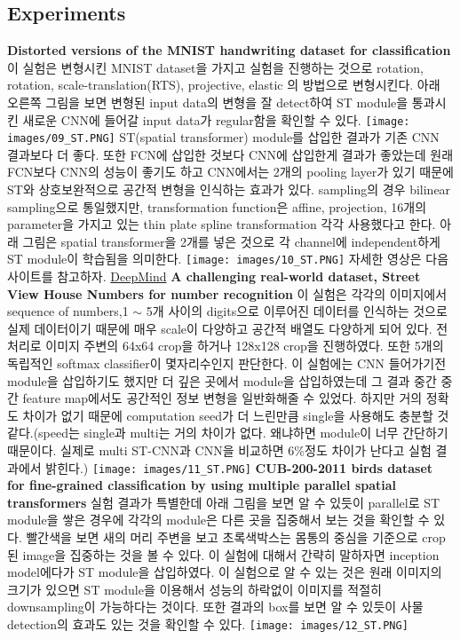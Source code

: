 \documentclass[extendedabs]{bmvc2k}
\begin{document}
 \subsection{Experiments}
 \textbf{Distorted versions of the MNIST handwriting dataset for classification} 이 실험은 변형시킨 MNIST dataset을 가지고 실험을 진행하는 것으로 rotation, rotation, scale-translation(RTS), projective, elastic
 의 방법으로 변형시킨다. 아래 오른쪽 그림을 보면 변형된 input data의 변형을 잘 detect하여 ST module을 통과시킨 새로운 CNN에 들어갈 input data가 regular함을 확인할 수 있다.
 \newline  \texttt{[image: images/09\_ST.PNG]}
  ST(spatial transformer) module를 삽입한 결과가 기존 CNN 결과보다 더 좋다. 또한 FCN에 삽입한 것보다 CNN에 삽입한게 결과가 좋았는데 원래 FCN보다 CNN의 성능이 좋기도 하고 
  CNN에서는 2개의 pooling layer가 있기 때문에 ST와 상호보완적으로 공간적 변형을 인식하는 효과가 있다. sampling의 경우 bilinear sampling으로 통일했지만, transformation function은 
  affine, projection, 16개의 parameter을 가지고 있는 thin plate spline transformation 각각 사용했다고 한다.
 아래 그림은 spatial transformer을 2개를 넣은 것으로 각 channel에 independent하게 ST module이 학습됨을 의미한다. 
 \newline  \texttt{[image: images/10\_ST.PNG]}
 자세한 영상은 다음 사이트를 참고하자.
 \href{https://www.youtube.com/watch?v=yGFVO2B8gok&t=8s}{DeepMind}
 \newline \textbf{A challenging real-world dataset, Street View House Numbers for number recognition}
 이 실험은 각각의 이미지에서 sequence of numbers,1 $\sim$ 5개 사이의 digits으로 이루어진 데이터를 인식하는 것으로 실제 데이터이기 때문에 매우 scale이 다양하고 
 공간적 배열도 다양하게 되어 있다. 전처리로 이미지 주변의 64x64 crop을 하거나 128x128 crop을 진행하였다. 또한 5개의 독립적인 softmax classifier이 몇자리수인지 판단한다.
 이 실험에는 CNN 들어가기전 module을 삽입하기도 했지만 더 깊은 곳에서 module을 삽입하였는데 그 결과 중간 중간 feature map에서도 공간적인 정보 변형을 일반화해줄 수 있었다.
 하지만 거의 정확도 차이가 없기 때문에 computation seed가 더 느린만큼 single을 사용해도 충분할 것 같다.(speed는 single과 multi는 거의 차이가 없다. 왜냐하면 module이 너무 간단하기 때문이다.
 실제로 multi ST-CNN과 CNN을 비교하면 6\%정도 차이가 난다고 실험 결과에서 밝힌다.)
 \newline  \texttt{[image: images/11\_ST.PNG]}
 \newline \textbf{CUB-200-2011 birds dataset for fine-grained classification by using multiple parallel spatial transformers}
 실험 결과가 특별한데 아래 그림을 보면 알 수 있듯이 parallel로 ST module을 쌓은 경우에 각각의 module은 다른 곳을 집중해서 보는 것을 확인할 수 있다.
 빨간색을 보면 새의 머리 주변을 보고 초록색박스는 몸통의 중심을 기준으로 crop된 image을 집중하는 것을 볼 수 있다. 이 실험에 대해서 간략히 말하자면 inception model에다가
 ST module을 삽입하였다. 이 실험으로 알 수 있는 것은 원래 이미지의 크기가 있으면 ST module을 이용해서 성능의 하락없이 이미지를 적절히 downsampling이 가능하다는 것이다.
 또한 결과의 box를 보면 알 수 있듯이 사물 detection의 효과도 있는 것을 확인할 수 있다.
 \newline  \texttt{[image: images/12\_ST.PNG]}
\end{document}
